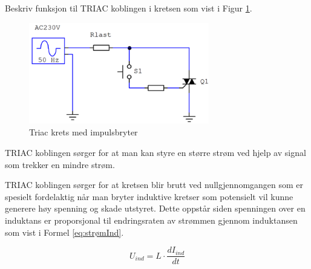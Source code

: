 
\begin{question}[name=Spørsmål, topic=tyristor]
Beskriv funksjon til TRIAC koblingen i kretsen som vist i Figur \ref{fig:triPush}.
\begin{figure}[H]
	\centering
	\includegraphics[width=0.7\textwidth]{tyristor/figurer/tricBasic.png}
	\caption{Triac krets med impulsbryter}
	\label{fig:triPush}
\end{figure}
\end{question}

\vspace{0.5cm} %

\begin{solution}[name=Løsningsforslag]
TRIAC koblingen sørger for at man kan styre en større strøm ved hjelp av signal som trekker en mindre strøm.

TRIAC koblingen sørger for at kretsen blir brutt ved nullgjennomgangen som er spesielt fordelaktig når man bryter induktive kretser som potensielt vil kunne generere høy spenning og skade utstyret. Dette oppstår siden spenningen over en induktans er proporsjonal til endringsraten av strømmen gjennom induktansen som vist i Formel \ref{eq:strømInd}.

\begin{equation}
	\label{eq:strømInd}
	U_{ind}=L \cdot \frac{dI_{ind}}{dt}
\end{equation}

\end{solution}





